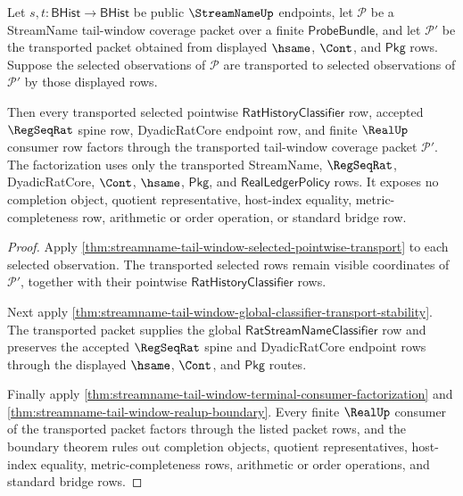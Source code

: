 \begin{theorem}
\label{thm:streamname-tail-window-selected-transport-coverage}
Let $s,t:\mathsf{BHist}\to\mathsf{BHist}$ be public $\StreamNameUp$
endpoints, let $\mathcal P$ be a StreamName tail-window coverage packet over a
finite $\mathsf{ProbeBundle}$, and let $\mathcal P'$ be the transported packet
obtained from displayed $\hsame$, $\Cont$, and $\mathsf{Pkg}$ rows. Suppose the
selected observations of $\mathcal P$ are transported to selected observations
of $\mathcal P'$ by those displayed rows.

Then every transported selected pointwise
$\mathsf{RatHistoryClassifier}$ row, accepted $\RegSeqRat$ spine row,
DyadicRatCore endpoint row, and finite $\RealUp$ consumer row factors through
the transported tail-window coverage packet $\mathcal P'$. The factorization
uses only the transported StreamName, $\RegSeqRat$, DyadicRatCore, $\Cont$,
$\hsame$, $\mathsf{Pkg}$, and $\mathsf{RealLedgerPolicy}$ rows. It exposes no
completion object, quotient representative, host-index equality,
metric-completeness row, arithmetic or order operation, or standard bridge row.
\end{theorem}
\begin{proof}
Apply \autoref{thm:streamname-tail-window-selected-pointwise-transport} to each
selected observation. The transported selected rows remain visible coordinates
of $\mathcal P'$, together with their pointwise
$\mathsf{RatHistoryClassifier}$ rows.

Next apply
\autoref{thm:streamname-tail-window-global-classifier-transport-stability}. The
transported packet supplies the global
$\mathsf{RatStreamNameClassifier}$ row and preserves the accepted
$\RegSeqRat$ spine and DyadicRatCore endpoint rows through the displayed
$\hsame$, $\Cont$, and $\mathsf{Pkg}$ routes.

Finally apply
\autoref{thm:streamname-tail-window-terminal-consumer-factorization} and
\autoref{thm:streamname-tail-window-realup-boundary}. Every finite $\RealUp$
consumer of the transported packet factors through the listed packet rows, and
the boundary theorem rules out completion objects, quotient representatives,
host-index equality, metric-completeness rows, arithmetic or order operations,
and standard bridge rows.
\end{proof}

